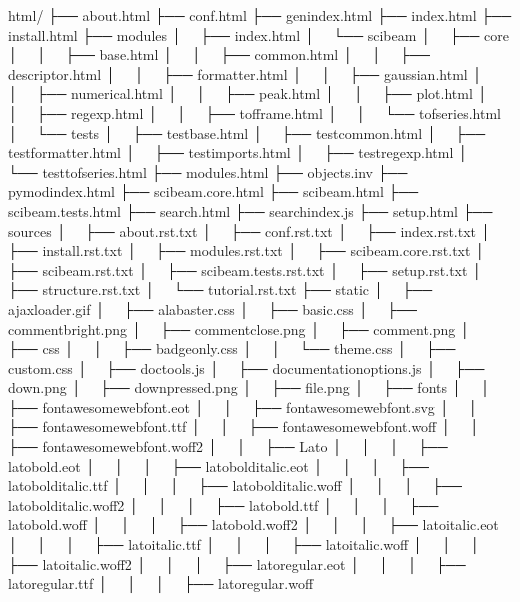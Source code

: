 \documentclass[letterpaper,10pt,english]{sphinxmanual}
\begin{document}
%
\begin{sphinxVerbatim}[commandchars=\\\{\}]
html/
├── about.html
├── conf.html
├── genindex.html
├── index.html
├── install.html
├── \PYGZus{}modules
│   ├── index.html
│   └── scibeam
│       ├── core
│       │   ├── base.html
│       │   ├── common.html
│       │   ├── descriptor.html
│       │   ├── formatter.html
│       │   ├── gaussian.html
│       │   ├── numerical.html
│       │   ├── peak.html
│       │   ├── plot.html
│       │   ├── regexp.html
│       │   ├── tofframe.html
│       │   └── tofseries.html
│       └── tests
│           ├── test\PYGZus{}base.html
│           ├── test\PYGZus{}common.html
│           ├── test\PYGZus{}formatter.html
│           ├── test\PYGZus{}imports.html
│           ├── test\PYGZus{}regexp.html
│           └── test\PYGZus{}tofseries.html
├── modules.html
├── objects.inv
├── py\PYGZhy{}modindex.html
├── scibeam.core.html
├── scibeam.html
├── scibeam.tests.html
├── search.html
├── searchindex.js
├── setup.html
├── \PYGZus{}sources
│   ├── about.rst.txt
│   ├── conf.rst.txt
│   ├── index.rst.txt
│   ├── install.rst.txt
│   ├── modules.rst.txt
│   ├── scibeam.core.rst.txt
│   ├── scibeam.rst.txt
│   ├── scibeam.tests.rst.txt
│   ├── setup.rst.txt
│   ├── structure.rst.txt
│   └── tutorial.rst.txt
├── \PYGZus{}static
│   ├── ajax\PYGZhy{}loader.gif
│   ├── alabaster.css
│   ├── basic.css
│   ├── comment\PYGZhy{}bright.png
│   ├── comment\PYGZhy{}close.png
│   ├── comment.png
│   ├── css
│   │   ├── badge\PYGZus{}only.css
│   │   └── theme.css
│   ├── custom.css
│   ├── doctools.js
│   ├── documentation\PYGZus{}options.js
│   ├── down.png
│   ├── down\PYGZhy{}pressed.png
│   ├── file.png
│   ├── fonts
│   │   ├── fontawesome\PYGZhy{}webfont.eot
│   │   ├── fontawesome\PYGZhy{}webfont.svg
│   │   ├── fontawesome\PYGZhy{}webfont.ttf
│   │   ├── fontawesome\PYGZhy{}webfont.woff
│   │   ├── fontawesome\PYGZhy{}webfont.woff2
│   │   ├── Lato
│   │   │   ├── lato\PYGZhy{}bold.eot
│   │   │   ├── lato\PYGZhy{}bolditalic.eot
│   │   │   ├── lato\PYGZhy{}bolditalic.ttf
│   │   │   ├── lato\PYGZhy{}bolditalic.woff
│   │   │   ├── lato\PYGZhy{}bolditalic.woff2
│   │   │   ├── lato\PYGZhy{}bold.ttf
│   │   │   ├── lato\PYGZhy{}bold.woff
│   │   │   ├── lato\PYGZhy{}bold.woff2
│   │   │   ├── lato\PYGZhy{}italic.eot
│   │   │   ├── lato\PYGZhy{}italic.ttf
│   │   │   ├── lato\PYGZhy{}italic.woff
│   │   │   ├── lato\PYGZhy{}italic.woff2
│   │   │   ├── lato\PYGZhy{}regular.eot
│   │   │   ├── lato\PYGZhy{}regular.ttf
│   │   │   ├── lato\PYGZhy{}regular.woff

\end{sphinxVerbatim}
\end{document}
